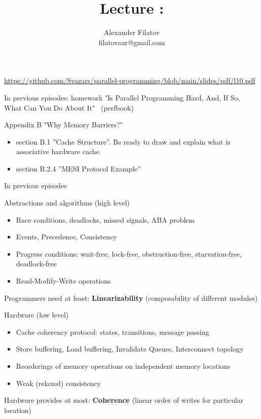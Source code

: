 


\title[]{Lecture \langMMNum: \langMMTopic}
\subtitle[]{\langMMKey}
\author[]{Alexander Filatov\\ filatovaur@gmail.com}

\date{}



\begin{frame}
  \titlepage
  \url{https://github.com/Svazars/parallel-programming/blob/main/slides/pdf/l10.pdf}
\end{frame}


\begin{frame}{In previous episodes: homework}
"Is Parallel Programming Hard, And, If So, What Can You Do About It" \ (perfbook) 

Appendix B "Why Memory Barriers?"

\begin{itemize}
    \item section B.1 ''Cache Structure''. Be ready to draw and explain what is associative hardware cache.
    \item section B.2.4 ''MESI Protocol Example''
\end{itemize}
\end{frame}

\begin{frame}{In previous episodes}

Abstractions and algorithms (high level)
\begin{itemize} 
 \item Race conditions, deadlocks, missed signals, ABA problem
 \item Events, Precedence, Consistency
 \item Progress conditions: wait-free, lock-free, obstruction-free, starvation-free, deadlock-free 
 \item Read-Modify-Write operations
\end{itemize}

Programmers need at least: \textbf{Linearizability} (composability of different modules)

Hardware (low level)
\begin{itemize}    
    \item Cache coherency protocol: states, transitions, message passing
    \item Store buffering, Load buffering, Invalidate Queues, Interconnect topology
    \item Reorderings of memory operations on independent memory locations
    \item Weak (relaxed) consistency
\end{itemize}

Hardware provides at most: \textbf{Coherence} (linear order of writes for particular location)

\end{frame}

